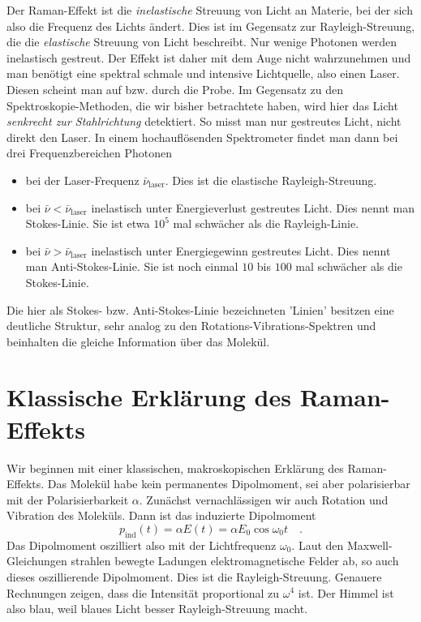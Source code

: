 Der Raman-Effekt ist die \emph{inelastische} Streuung von Licht an Materie, bei der sich also die Frequenz des Lichts ändert. Dies ist im Gegensatz zur Rayleigh-Streuung, die die \emph{elastische} Streuung von Licht beschreibt. Nur wenige Photonen werden inelastisch gestreut. Der Effekt ist daher mit dem Auge nicht wahrzunehmen und man benötigt eine spektral schmale und intensive Lichtquelle, also einen Laser. Diesen scheint man auf bzw. durch die Probe. Im Gegensatz zu den Spektroskopie-Methoden, die wir bisher betrachtete haben, wird hier das Licht \emph{senkrecht zur Stahlrichtung} detektiert. So misst man nur gestreutes Licht, nicht direkt den Laser. In einem hochauflösenden Spektrometer findet man dann bei drei Frequenzbereichen Photonen
\begin{itemize} \setlength{\itemsep}{0pt}
\item bei der Laser-Frequenz $\bar{\nu}_\text{laser}$. Dies ist die elastische Rayleigh-Streuung.
\item bei $\bar{\nu} < \bar{\nu}_\text{laser}$ inelastisch unter Energieverlust  gestreutes Licht. Dies nennt man Stokes-Linie. Sie ist etwa $10^{5}$ mal schwächer als die Rayleigh-Linie.
\item bei $\bar{\nu} > \bar{\nu}_\text{laser}$ inelastisch unter Energiegewinn gestreutes Licht. Dies nennt man Anti-Stokes-Linie. Sie ist noch einmal $10$ bis $100$ mal schwächer als die Stokes-Linie.
\end{itemize}
Die hier als Stokes- bzw. Anti-Stokes-Linie bezeichneten 'Linien' besitzen eine deutliche Struktur, sehr analog zu den Rotations-Vibrations-Spektren und beinhalten die gleiche Information über das Molekül.


\section{Klassische Erklärung des Raman-Effekts}

Wir beginnen mit einer klassischen, makroskopischen Erklärung des Raman-Effekts. Das Molekül habe kein permanentes Dipolmoment, sei aber polarisierbar mit der Polarisierbarkeit $\alpha$. Zunächst vernachlässigen wir auch Rotation und Vibration des Moleküls. Dann ist das induzierte Dipolmoment
\begin{equation}
p_\text{ind}(t) = \alpha E(t) = \alpha E_0 \cos \omega_0 t \quad .
\end{equation}
Das Dipolmoment oszilliert also mit der Lichtfrequenz $\omega_0$. Laut den Maxwell-Gleichungen strahlen bewegte Ladungen elektromagnetische Felder ab, so auch dieses oszillierende Dipolmoment. Dies ist die Rayleigh-Streuung. Genauere Rechnungen zeigen, dass die Intensität proportional zu $\omega^4$ ist. Der Himmel ist also blau, weil blaues Licht besser Rayleigh-Streuung macht.

